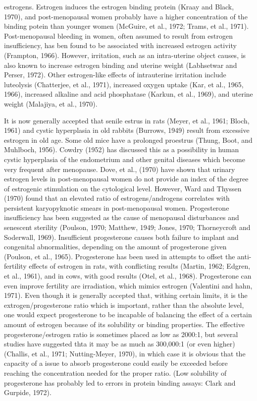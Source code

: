 estrogens. Estrogen induces the estrogen binding protein (Kraay and Black, 1970), and post-menopausal women probably have a higher concentration of the binding potein than younger women (McGuire, et al., 1972; Trams, et al., 1971). Post-menopausal bleeding in women, often assumed to result from estrogen
insufficiency, has ben found to be associated with increased estrogen activity (Frampton, 1966). However, irritation, such as an intra-uterine object causes, is also known to increase estrogen binding and uterine weight (Labhsetwar and Perser, 1972). Other estrogen-like effects of intrauterine irritation include luteolysis
(Chatterjee, et al., 1971), increased oxygen uptake (Kar, et al., 1965, 1966), increased alkaline and acid phosphatase (Karkun, et al., 1969), and uterine weight (Malajiya, et al., 1970).

It is now generally accepted that senile estrus in rats (Meyer, et al., 1961; Bloch, 1961) and cystic hyperplasia in old rabbits (Burrows, 1949) result from excessive estrogen in old age. Some old mice have a prolonged proestrus (Thung, Boot, and Muhlboch, 1956). Cowdry (1952) has discussed this as a possibility in human cystic hyperplasia
of the endometrium and other genital diseases which become very frequent after menopause. Dove, et al., (1970) have shown that urinary estrogen levels in post-menopausal women do not provide an index of the degree of estrogenic stimulation on the cytological level. However, Ward and Thyssen (1970) found that an elevated ratio of estrogens/androgens correlates
with persistent karyopyknotic smears in post-menopausal women. Progesterone insufficiency has been suggested as the cause of menopausal disturbances and senescent sterility (Poulson, 1970; Matthew, 1949; Jones, 1970; Thorneycroft and Soderwall, 1969). Insufficient progesterone causes both failure to implant and congenital abnormalities, depending on the
amount of progesterone given (Poulson, et al., 1965). Progesterone has been used in attempts to offset the anti-fertility effects of estrogen in rats, with conflicting results (Martin, 1962; Edgren, et al., 1961), and in cows, with good results (Otel, et al., 1968). Progesterone can even improve fertility are irradiation, which mimics estrogen (Valentini and hahn, 1971). Even
though it is generally accepted that, withing certain limits, it is the extrogen/progesterone ratio which is important, rather than the absolute level, one would expect progesterone to be incapable of balancing the effect of a certain amount of estrogen because of its solubility or binding properties. The effective progesterone/estrogen ratio is sometimes placed
as low as 2000:1, but several studies have suggested thta it may be as much as 300,000:1 (or even higher) (Challis, et al., 1971; Nutting-Meyer, 1970), in which case it is obvious that the capacity of a issue to absorb progesterone could easily be exceeded before reaching the concentration needed for the proper ratio. (Low solubility of progesterone has probably led to
errors in protein binding assays: Clark and Gurpide, 1972).

